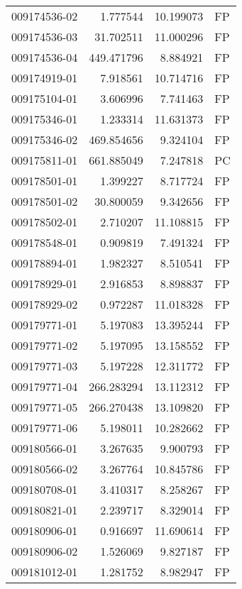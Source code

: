 \begin{tabular}{lrrl}
009174536-02 &    1.777544 &      10.199073 &   FP \\
009174536-03 &   31.702511 &      11.000296 &   FP \\
009174536-04 &  449.471796 &       8.884921 &   FP \\
009174919-01 &    7.918561 &      10.714716 &   FP \\
009175104-01 &    3.606996 &       7.741463 &   FP \\
009175346-01 &    1.233314 &      11.631373 &   FP \\
009175346-02 &  469.854656 &       9.324104 &   FP \\
009175811-01 &  661.885049 &       7.247818 &   PC \\
009178501-01 &    1.399227 &       8.717724 &   FP \\
009178501-02 &   30.800059 &       9.342656 &   FP \\
009178502-01 &    2.710207 &      11.108815 &   FP \\
009178548-01 &    0.909819 &       7.491324 &   FP \\
009178894-01 &    1.982327 &       8.510541 &   FP \\
009178929-01 &    2.916853 &       8.898837 &   FP \\
009178929-02 &    0.972287 &      11.018328 &   FP \\
009179771-01 &    5.197083 &      13.395244 &   FP \\
009179771-02 &    5.197095 &      13.158552 &   FP \\
009179771-03 &    5.197228 &      12.311772 &   FP \\
009179771-04 &  266.283294 &      13.112312 &   FP \\
009179771-05 &  266.270438 &      13.109820 &   FP \\
009179771-06 &    5.198011 &      10.282662 &   FP \\
009180566-01 &    3.267635 &       9.900793 &   FP \\
009180566-02 &    3.267764 &      10.845786 &   FP \\
009180708-01 &    3.410317 &       8.258267 &   FP \\
009180821-01 &    2.239717 &       8.329014 &   FP \\
009180906-01 &    0.916697 &      11.690614 &   FP \\
009180906-02 &    1.526069 &       9.827187 &   FP \\
009181012-01 &    1.281752 &       8.982947 &   FP \\

\end{tabular}
